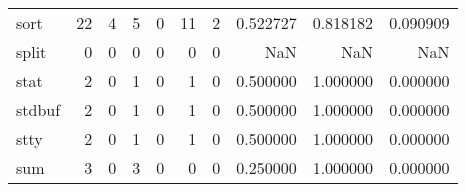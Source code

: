 \begin{tabular}{lrrrrrrrrr}
sort      &                                                 22 &                                                  4 &                                                  5 &                                                  0 &                                                 11 &                                                  2 &                                           0.522727 &                               0.818182 &                             0.090909 \\
split     &                                                  0 &                                                  0 &                                                  0 &                                                  0 &                                                  0 &                                                  0 &                                                NaN &                                    NaN &                                  NaN \\
stat      &                                                  2 &                                                  0 &                                                  1 &                                                  0 &                                                  1 &                                                  0 &                                           0.500000 &                               1.000000 &                             0.000000 \\
stdbuf    &                                                  2 &                                                  0 &                                                  1 &                                                  0 &                                                  1 &                                                  0 &                                           0.500000 &                               1.000000 &                             0.000000 \\
stty      &                                                  2 &                                                  0 &                                                  1 &                                                  0 &                                                  1 &                                                  0 &                                           0.500000 &                               1.000000 &                             0.000000 \\
sum       &                                                  3 &                                                  0 &                                                  3 &                                                  0 &                                                  0 &                                                  0 &                                           0.250000 &                               1.000000 &                             0.000000 \\

\end{tabular}
